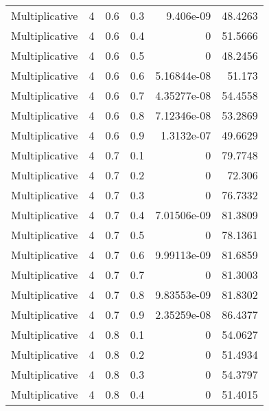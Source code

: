 \documentclass{article}
\begin{document}
\begin{longtable}[H]{lrrrrr}
 Multiplicative &       4 &   0.6 &            0.3 &      9.406e-09   &         48.4263 \\
 Multiplicative &       4 &   0.6 &            0.4 &      0           &         51.5666 \\
 Multiplicative &       4 &   0.6 &            0.5 &      0           &         48.2456 \\
 Multiplicative &       4 &   0.6 &            0.6 &      5.16844e-08 &         51.173  \\
 Multiplicative &       4 &   0.6 &            0.7 &      4.35277e-08 &         54.4558 \\
 Multiplicative &       4 &   0.6 &            0.8 &      7.12346e-08 &         53.2869 \\
 Multiplicative &       4 &   0.6 &            0.9 &      1.3132e-07  &         49.6629 \\
 Multiplicative &       4 &   0.7 &            0.1 &      0           &         79.7748 \\
 Multiplicative &       4 &   0.7 &            0.2 &      0           &         72.306  \\
 Multiplicative &       4 &   0.7 &            0.3 &      0           &         76.7332 \\
 Multiplicative &       4 &   0.7 &            0.4 &      7.01506e-09 &         81.3809 \\
 Multiplicative &       4 &   0.7 &            0.5 &      0           &         78.1361 \\
 Multiplicative &       4 &   0.7 &            0.6 &      9.99113e-09 &         81.6859 \\
 Multiplicative &       4 &   0.7 &            0.7 &      0           &         81.3003 \\
 Multiplicative &       4 &   0.7 &            0.8 &      9.83553e-09 &         81.8302 \\
 Multiplicative &       4 &   0.7 &            0.9 &      2.35259e-08 &         86.4377 \\
 Multiplicative &       4 &   0.8 &            0.1 &      0           &         54.0627 \\
 Multiplicative &       4 &   0.8 &            0.2 &      0           &         51.4934 \\
 Multiplicative &       4 &   0.8 &            0.3 &      0           &         54.3797 \\
 Multiplicative &       4 &   0.8 &            0.4 &      0           &         51.4015 \\

\end{longtable}
\end{document}
